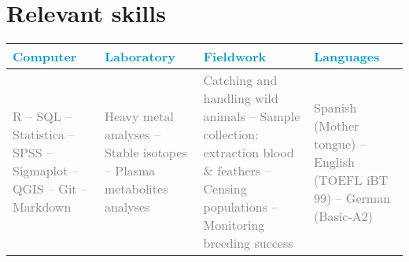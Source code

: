 \documentclass[11pt,a4paper,]{awesome-cv}
\begin{document}
\hypertarget{relevant-skills}{%
\section{Relevant skills}\label{relevant-skills}}

\begin{tabular}[t]{>{\centering\arraybackslash}p{4cm}>{\centering\arraybackslash}p{4cm}>{\centering\arraybackslash}p{4cm}>{\centering\arraybackslash}p{4cm}}
\toprule
\textcolor[HTML]{009acd}{\textbf{Computer}} & \textcolor[HTML]{009acd}{\textbf{Laboratory}} & \textcolor[HTML]{009acd}{\textbf{Fieldwork}} & \textcolor[HTML]{009acd}{\textbf{Languages}}\\
\midrule
\textcolor[HTML]{7f7f7f}{R -- SQL -- Statistica -- SPSS -- Sigmaplot -- QGIS -- Git -- Markdown} & \textcolor[HTML]{7f7f7f}{Heavy metal analyses -- Stable isotopes -- Plasma metabolites analyses} & \textcolor[HTML]{7f7f7f}{Catching and handling wild animals -- Sample collection: extraction blood \& feathers -- Censing populations -- Monitoring breeding success} & \textcolor[HTML]{7f7f7f}{Spanish (Mother tongue) -- English (TOEFL iBT 99) -- German (Basic-A2)}\\
\bottomrule
\end{tabular}
\end{document}
